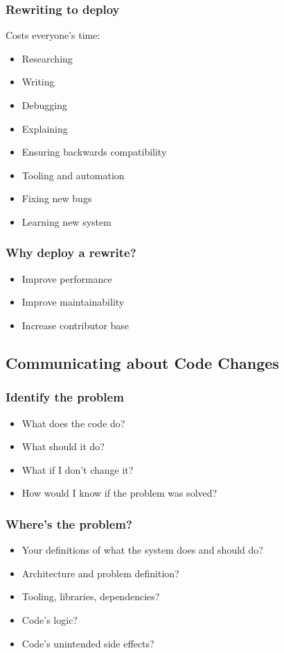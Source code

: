 \documentclass{beamer}
\begin{document}
\begin{frame}[fragile]
\frametitle{Rewriting to deploy}
Costs everyone's time:
\begin{itemize}[<+(1)->]
\item Researching
\item Writing
\item Debugging
\item Explaining
\item Ensuring backwards compatibility
\item Tooling and automation
\item Fixing new bugs
\item Learning new system
\end{itemize}
\end{frame}

\begin{frame}[fragile]
\frametitle{Why deploy a rewrite?}
\begin{itemize}[<+(1)->]
\item Improve performance
\item Improve maintainability
\item Increase contributor base
\end{itemize}
\end{frame}

\subsection{Communicating about Code Changes}

\begin{frame}[fragile]
\tableofcontents[currentsubsection]
\end{frame}

\begin{frame}[fragile]
\frametitle{Identify the problem}
\begin{itemize}[<+(1)->]
\item What does the code do?
\item What should it do?
\item What if I don't change it?
\item How would I know if the problem was solved?
\end{itemize}
\end{frame}

\begin{frame}[fragile]
\frametitle{Where's the problem?}
\begin{itemize}[<+(1)->]
\item Your definitions of what the system does and should do?
\item Architecture and problem definition?
\item Tooling, libraries, dependencies?
\item Code's logic?
\item Code's unintended side effects?
\end{itemize}
\end{frame}
\end{document}
